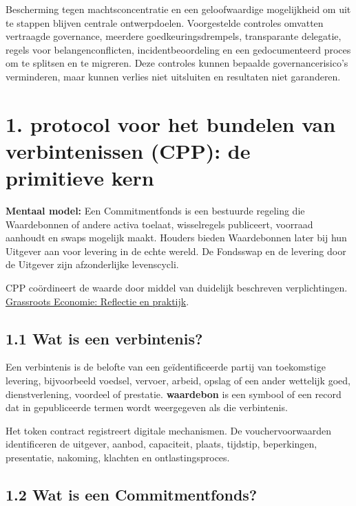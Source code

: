 \documentclass[11pt]{article}
\begin{document}
Bescherming tegen machtsconcentratie en een geloofwaardige mogelijkheid om uit te stappen blijven centrale ontwerpdoelen. Voorgestelde controles omvatten vertraagde governance, meerdere goedkeuringsdrempels, transparante delegatie, regels voor belangenconflicten, incidentbeoordeling en een gedocumenteerd proces om te splitsen en te migreren. Deze controles kunnen bepaalde governancerisico's verminderen, maar kunnen verlies niet uitsluiten en resultaten niet garanderen.


\section*{1. protocol voor het bundelen van verbintenissen (CPP): de primitieve kern}

\textbf{Mentaal model:} Een Commitmentfonds is een bestuurde regeling die Waardebonnen of andere activa toelaat, wisselregels publiceert, voorraad aanhoudt en swaps mogelijk maakt. Houders bieden Waardebonnen later bij hun Uitgever aan voor levering in de echte wereld. De Fondsswap en de levering door de Uitgever zijn afzonderlijke levenscycli.

CPP coördineert de waarde door middel van duidelijk beschreven verplichtingen. \href{https://willruddick.substack.com/p/grassroots-economics-the-book-is}{Grassroots Economie: Reflectie en praktijk}.

\subsection*{1.1 Wat is een verbintenis?}

Een verbintenis is de belofte van een geïdentificeerde partij van toekomstige levering, bijvoorbeeld voedsel, vervoer, arbeid, opslag of een ander wettelijk goed, dienstverlening, voordeel of prestatie. \textbf{waardebon} is een symbool of een record dat in gepubliceerde termen wordt weergegeven als die verbintenis.

Het token contract registreert digitale mechanismen. De vouchervoorwaarden identificeren de uitgever, aanbod, capaciteit, plaats, tijdstip, beperkingen, presentatie, nakoming, klachten en ontlastingsproces.

\subsection*{1.2 Wat is een Commitmentfonds?}
\end{document}
